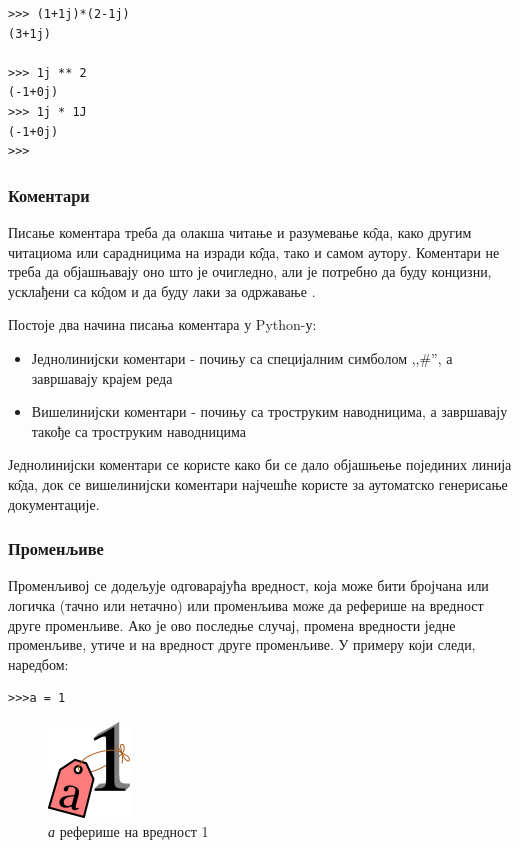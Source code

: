 \begin{lstlisting}[caption = Операције са комплексним бројевима, label = kompleksni]
>>> (1+1j)*(2-1j)
(3+1j)

>>> 1j ** 2
(-1+0j)
>>> 1j * 1J
(-1+0j)
>>>
\end{lstlisting}

\subsubsection{Коментари}

Писање коментара треба да олакша читање и разумевање к\^{о}да, како другим читациома или сарадницима на изради к\^{о}да, тако и самом аутору. Коментари не треба да објашњавају оно што је очигледно, али је потребно да буду концизни, усклађени са к\^{о}дом и да буду лаки за одржавање \cite{maric}.

Постоје два начина писања коментара у Python-у:

\begin{itemize}
\item Једнолинијски коментари - почињу са специјалним симболом ,,\#'', а завршавају крајем реда
\item Вишелинијски коментари - почињу са троструким наводницима, а завршавају такође са троструким наводницима
\end{itemize}

Једнолинијски коментари се користе како би се дало објашњење појединих линија к\^{о}да, док се вишелинијски коментари најчешће користе за аутоматско генерисање документације.

\subsubsection{Променљиве}

Променљивој се додељује одговарајућа вредност, која може бити бројчана или логичка (тачно или нетачно) или променљива може да реферише на вредност друге променљиве. Ако је ово последње случај, промена вредности једне променљиве, утиче и на вредност друге променљиве. У примеру који следи, наредбом:

\begin{lstlisting}
>>>a = 1
\end{lstlisting}

\begin{figure}[here]
\centering
\includegraphics{1a.png}
\caption{\emph{а} реферише на вредност 1}
\label{slike:a_je_1}
\end{figure}

